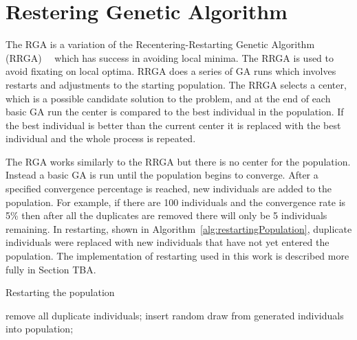 \section{Restering Genetic Algorithm}

The RGA is a variation of the Recentering-Restarting Genetic Algorithm (RRGA)~\cite{hughes2013recentering}~\cite{hughes2013edit} which has success in avoiding local minima. The RRGA is used to avoid fixating on local optima. RRGA does a series of GA runs which involves restarts and adjustments to the starting population. The RRGA selects a center, which is a possible candidate solution to the problem, and at the end of each basic GA run the center is compared to the best individual in the population. If the best individual is better than the current center it is replaced with the best individual and the whole process is repeated.

The RGA works similarly to the RRGA but there is no center for the population. Instead a basic GA is run until the population begins to converge. After a specified convergence percentage is reached, new individuals are added to the population. For example, if there are 100 individuals and the convergence rate is 5\% then after all the duplicates are removed there will only be 5 individuals remaining. In restarting, shown in Algorithm~\ref{alg:restartingPopulation}, duplicate individuals were replaced with new individuals that have not yet entered the population. The implementation of restarting used in this work is described more fully in Section TBA.

\begin{algorithm}
\caption{Restarting the population}
\label{alg:restartingPopulation}
\begin{algorithmic}

  \STATE remove all duplicate individuals;
    \STATE insert random draw from generated individuals into population;
  \ENDWHILE
\ENDIF

\end{algorithmic}
\end{algorithm}